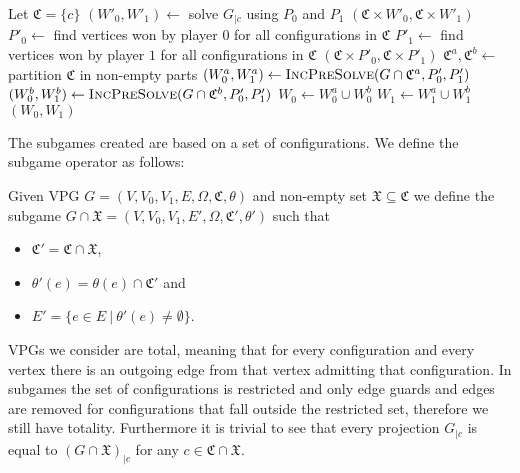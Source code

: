 \begin{algorithm}
	\caption{$\textsc{IncPreSolve}(\textit{VPG } G = (V,V_0,V_1, E, \Omega, \mathfrak{C}, \theta), P_0,P_1)$}\label{alg_IncPreSolveBasic}
	\begin{algorithmic}[1]
		\State Let $\mathfrak{C} = \{c\}$
		\State $(W'_0,W'_1) \gets $ solve $G_{|c}$ using $P_0$ and $P_1$
		\State \Return $(\mathfrak{C} \times W'_0, \mathfrak{C} \times W'_1)$
		\EndIf
		\State $P'_0 \gets$ find vertices won by player $0$ for all configurations in $\mathfrak{C}$
		\State $P'_1 \gets$ find vertices won by player $1$ for all configurations in $\mathfrak{C}$
		\State \Return $(\mathfrak{C} \times P'_0, \mathfrak{C} \times P'_1)$
		\EndIf
		\State $\mathfrak{C}^a, \mathfrak{C}^b \gets $ partition $\mathfrak{C}$ in non-empty parts
		\State $(W_0^a, W_1^a) \gets \textsc{IncPreSolve}(G \cap \mathfrak{C}^a, P'_0,P'_1)$
		\State $(W_0^b, W_1^b) \gets \textsc{IncPreSolve}(G \cap \mathfrak{C}^b, P'_0,P'_1)$
		\State $W_0 \gets W_0^a \cup W_0^b$
		\State $W_1 \gets W_1^a \cup W_1^b$
		\State \Return $(W_0,W_1)$
	\end{algorithmic}
\end{algorithm}
The subgames created are based on a set of configurations. We define the subgame operator as follows:
\begin{definition}
	Given VPG $G = (V,V_0,V_1,E,\Omega,\mathfrak{C},\theta)$ and non-empty set $\mathfrak{X} \subseteq \mathfrak{C}$ we define the subgame $G \cap \mathfrak{X} = (V,V_0,V_1,E',\Omega,\mathfrak{C}', \theta')$ such that
	\begin{itemize}
		\item $\mathfrak{C}' =\mathfrak{C} \cap \mathfrak{X}$,
		\item $\theta'(e) = \theta(e) \cap \mathfrak{C}'$ and
		\item $E' = \{ e \in E\ |\ \theta'(e) \neq \emptyset \}$.
	\end{itemize}
\end{definition}
VPGs we consider are total, meaning that for every configuration and every vertex there is an outgoing edge from that vertex admitting that configuration. In subgames the set of configurations is restricted and only edge guards and edges are removed for configurations that fall outside the restricted set, therefore we still have totality. Furthermore it is trivial to see that every projection $G_{|c}$ is equal to $(G \cap \mathfrak{X})_{|c}$ for any $c \in \mathfrak{C} \cap \mathfrak{X}$.

